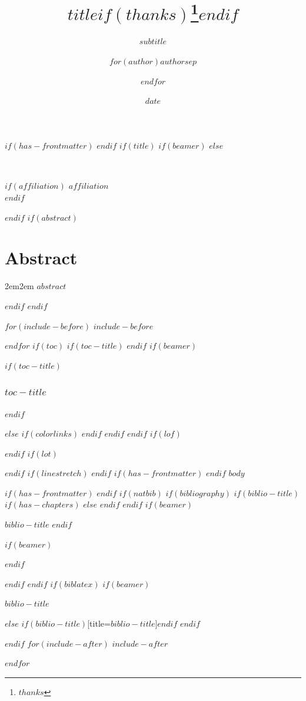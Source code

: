 \documentclass[
$if(fontsize)$
  $fontsize$,
$endif$
$if(papersize)$
  $papersize$paper,
$endif$
$if(beamer)$
  ignorenonframetext,
$if(handout)$
  handout,
$endif$
$if(aspectratio)$
  aspectratio=$aspectratio$,
$endif$
$endif$
$for(classoption)$
  $classoption$$sep$,
$endfor$
]{$documentclass$}
\title{$title$$if(thanks)$\thanks{$thanks$}$endif$}
\subtitle{$subtitle$}
\author{$for(author)$$author$$sep$ \and $endfor$}
\date{$date$}
\institute{$for(institute)$$institute$$sep$ \and $endfor$}
\makeatletter
\newif\ifbibliography
\renewcommand{\maketitle}{%
  \vspace*{-1.5em}%
  \begin{center}%
    {\section*{\centering\@title}} 
  \end{center}%
  \vspace{0.6em}%
\begin{center}%
  \small\itshape\@author\\
$if(affiliation)$  $affiliation$\\
$endif$  \@date\par%
\end{center}%
  \vspace{1em}%
}
\renewenvironment{abstract}%
  {\section*{Abstract}\begin{adjustwidth}{2em}{2em}\noindent\ignorespaces}%
  {\end{adjustwidth}\par\bigskip}
\makeatother
\begin{document}
$if(has-frontmatter)$
\frontmatter
$endif$
$if(title)$
$if(beamer)$
\frame{\titlepage}
$else$
\maketitle
$endif$
$if(abstract)$
\begin{abstract}
$abstract$
\end{abstract}
$endif$
$endif$

$for(include-before)$
$include-before$

$endfor$
$if(toc)$
$if(toc-title)$
\renewcommand*\contentsname{$toc-title$}
$endif$
$if(beamer)$
\begin{frame}[allowframebreaks]
$if(toc-title)$
  \frametitle{$toc-title$}
$endif$
  \tableofcontents[hideallsubsections]
\end{frame}
$else$
{
$if(colorlinks)$
\hypersetup{linkcolor=$if(toccolor)$$toccolor$$else$$endif$}
$endif$
\setcounter{tocdepth}{$toc-depth$}
\tableofcontents
}
$endif$
$endif$
$if(lof)$
\listoffigures
$endif$
$if(lot)$
\listoftables
$endif$
$if(linestretch)$
$endif$
$if(has-frontmatter)$
\mainmatter
$endif$
$body$

$if(has-frontmatter)$
\backmatter
$endif$
$if(natbib)$
$if(bibliography)$
$if(biblio-title)$
$if(has-chapters)$
\renewcommand\bibname{$biblio-title$}
$else$
\renewcommand\refname{$biblio-title$}
$endif$
$endif$
$if(beamer)$
\begin{frame}[allowframebreaks]{$biblio-title$}
  \bibliographytrue
$endif$
  
$if(beamer)$
\end{frame}
$endif$

$endif$
$endif$
$if(biblatex)$
$if(beamer)$
\begin{frame}[allowframebreaks]{$biblio-title$}
  \bibliographytrue
  \printbibliography[heading=none]
\end{frame}
$else$
\printbibliography$if(biblio-title)$[title=$biblio-title$]$endif$
$endif$

$endif$
$for(include-after)$
$include-after$

$endfor$
\end{document}
